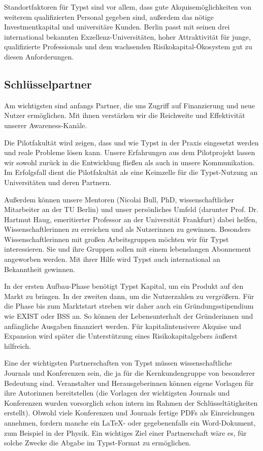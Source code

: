 \documentclass[11pt, a4paper]{article}
\newcommand{\gender}{\raisebox{-.25em}{*}}
\begin{document}
Standortfaktoren für Typst sind vor allem, dass gute Akquisemöglichkeiten von weiterem qualifizierten Personal gegeben sind, außerdem das nötige Investmentkapital und universitäre Kunden. Berlin passt mit seinen drei international bekannten Exzellenz-Universitäten, hoher Attraktivität für junge, qualifizierte Professionals und dem wachsenden Risikokapital-Ökosystem gut zu diesen Anforderungen.


\newpage
\subsection*{Schlüsselpartner}

Am wichtigsten sind anfangs Partner, die uns Zugriff auf Finanzierung und neue Nutzer ermöglichen. Mit ihnen verstärken wir die Reichweite und Effektivität unserer Awareness-Kanäle.

Die Pilotfakultät wird zeigen, dass und wie Typst in der Praxis eingesetzt werden und reale Probleme lösen kann. Unsere Erfahrungen aus dem Pilotprojekt lassen wir sowohl zurück in die Entwicklung fließen als auch in unsere Kommunikation. Im Erfolgsfall dient die Pilotfakultät als eine Keimzelle für die Typst-Nutzung an Universitäten und deren Partnern.

Außerdem können unsere Mentoren (Nicolai Bull, PhD, wissenschaftlicher Mitarbeiter an der TU Berlin) und unser persönliches Umfeld (darunter Prof. Dr. Hartmut Haug, emeritierter Professor an der Universität Frankfurt) dabei helfen, Wissenschaftler\gender{}innen zu erreichen und als Nutzer\gender{}innen zu gewinnen. Besonders Wissenschaftler\gender{}innen mit großen Arbeitsgruppen möchten wir für Typst interessieren. Sie und ihre Gruppen sollen mit einem lebenslangen Abonnement angeworben werden. Mit ihrer Hilfe wird Typst auch international an Bekanntheit gewinnen.

In der ersten Aufbau-Phase benötigt Typst Kapital, um ein Produkt auf den Markt zu bringen. In der zweiten dann, um die Nutzerzahlen zu vergrößern. Für die Phase bis zum Marktstart streben wir daher auch ein Gründungsstipendium wie EXIST oder BSS an. So können der Lebensunterhalt der Gründer\gender{}innen und anfängliche Ausgaben finanziert werden. Für kapitalintensivere Akquise und Expansion wird später die Unterstützung eines Risikokapitalgebers äußerst hilfreich.

Eine der wichtigsten Partnerschaften von Typst müssen wissenschaftliche Journals und Konferenzen sein, die ja für die Kernkundengruppe von besonderer Bedeutung sind. Veranstalter\gender{} und Herausgeber\gender{}innen können eigene Vorlagen für ihre Autor\gender{}innen bereitstellen (die Vorlagen der wichtigsten Journals und Konferenzen wurden vorsorglich schon intern im Rahmen der Schlüsseltätigkeiten erstellt). Obwohl viele Konferenzen und Journals fertige PDFs als Einreichungen annehmen, fordern manche ein LaTeX- oder gegebenenfalls ein Word-Dokument, zum Beispiel in der Physik. Ein wichtiges Ziel einer Partnerschaft wäre es, für solche Zwecke die Abgabe im Typst-Format zu ermöglichen.
\end{document}

